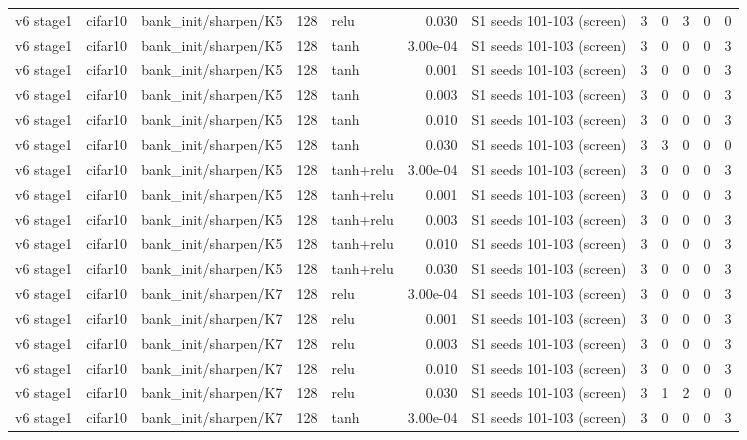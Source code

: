 \begin{table}[htbp]
{\begin{tabular}{@{}lllrlrlrrrrr@{}}
v6 stage1 & cifar10 & bank\_init/sharpen/K5 & 128 & relu & 0.030 & S1 seeds 101-103 (screen) & 3 & 0 & 3 & 0 & 0 \\
v6 stage1 & cifar10 & bank\_init/sharpen/K5 & 128 & tanh & 3.00e-04 & S1 seeds 101-103 (screen) & 3 & 0 & 0 & 0 & 3 \\
v6 stage1 & cifar10 & bank\_init/sharpen/K5 & 128 & tanh & 0.001 & S1 seeds 101-103 (screen) & 3 & 0 & 0 & 0 & 3 \\
v6 stage1 & cifar10 & bank\_init/sharpen/K5 & 128 & tanh & 0.003 & S1 seeds 101-103 (screen) & 3 & 0 & 0 & 0 & 3 \\
v6 stage1 & cifar10 & bank\_init/sharpen/K5 & 128 & tanh & 0.010 & S1 seeds 101-103 (screen) & 3 & 0 & 0 & 0 & 3 \\
v6 stage1 & cifar10 & bank\_init/sharpen/K5 & 128 & tanh & 0.030 & S1 seeds 101-103 (screen) & 3 & 3 & 0 & 0 & 0 \\
v6 stage1 & cifar10 & bank\_init/sharpen/K5 & 128 & tanh+relu & 3.00e-04 & S1 seeds 101-103 (screen) & 3 & 0 & 0 & 0 & 3 \\
v6 stage1 & cifar10 & bank\_init/sharpen/K5 & 128 & tanh+relu & 0.001 & S1 seeds 101-103 (screen) & 3 & 0 & 0 & 0 & 3 \\
v6 stage1 & cifar10 & bank\_init/sharpen/K5 & 128 & tanh+relu & 0.003 & S1 seeds 101-103 (screen) & 3 & 0 & 0 & 0 & 3 \\
v6 stage1 & cifar10 & bank\_init/sharpen/K5 & 128 & tanh+relu & 0.010 & S1 seeds 101-103 (screen) & 3 & 0 & 0 & 0 & 3 \\
v6 stage1 & cifar10 & bank\_init/sharpen/K5 & 128 & tanh+relu & 0.030 & S1 seeds 101-103 (screen) & 3 & 0 & 0 & 0 & 3 \\
v6 stage1 & cifar10 & bank\_init/sharpen/K7 & 128 & relu & 3.00e-04 & S1 seeds 101-103 (screen) & 3 & 0 & 0 & 0 & 3 \\
v6 stage1 & cifar10 & bank\_init/sharpen/K7 & 128 & relu & 0.001 & S1 seeds 101-103 (screen) & 3 & 0 & 0 & 0 & 3 \\
v6 stage1 & cifar10 & bank\_init/sharpen/K7 & 128 & relu & 0.003 & S1 seeds 101-103 (screen) & 3 & 0 & 0 & 0 & 3 \\
v6 stage1 & cifar10 & bank\_init/sharpen/K7 & 128 & relu & 0.010 & S1 seeds 101-103 (screen) & 3 & 0 & 0 & 0 & 3 \\
v6 stage1 & cifar10 & bank\_init/sharpen/K7 & 128 & relu & 0.030 & S1 seeds 101-103 (screen) & 3 & 1 & 2 & 0 & 0 \\
v6 stage1 & cifar10 & bank\_init/sharpen/K7 & 128 & tanh & 3.00e-04 & S1 seeds 101-103 (screen) & 3 & 0 & 0 & 0 & 3 \\

\end{tabular}}
\end{table}
